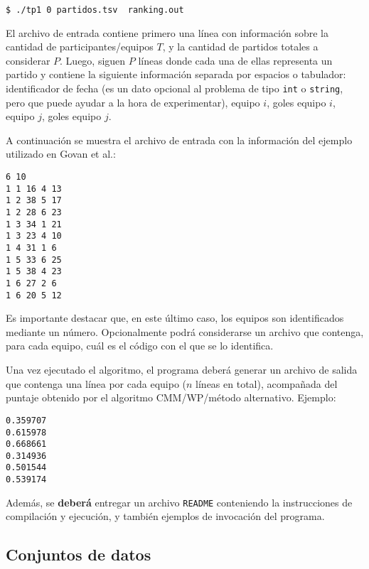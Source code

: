 \documentclass[11pt,a4paper]{article}
\begin{document}
\begin{verbatim}
$ ./tp1 0 partidos.tsv  ranking.out
\end{verbatim}

El archivo de entrada contiene primero una línea con información sobre la cantidad de participantes/equipos $T$, y la cantidad de partidos totales a considerar $P$. 
Luego, siguen $P$ líneas donde cada una de ellas representa un partido y contiene la siguiente información separada por espacios o tabulador: 
identificador de fecha (es un dato opcional al problema de tipo  \verb|int| o \verb+string+, pero que puede ayudar a la hora de experimentar), equipo $i$, goles equipo $i$, equipo $j$, goles equipo $j$.

A continuación se muestra el archivo de entrada con la información del ejemplo utilizado en Govan et al.\cite{Govan2008}:

\begin{verbatim}
6 10
1 1 16 4 13
1 2 38 5 17
1 2 28 6 23
1 3 34 1 21
1 3 23 4 10
1 4 31 1 6
1 5 33 6 25
1 5 38 4 23
1 6 27 2 6
1 6 20 5 12
\end{verbatim}

Es importante destacar que, en este último caso, los equipos son identificados mediante un número. Opcionalmente podrá considerarse un archivo que contenga,  para cada equipo, cuál es el código con el que se lo identifica.

Una vez ejecutado el algoritmo, el programa deberá generar un archivo de salida que contenga una línea por cada
equipo ($n$ líneas en total), acompañada del puntaje obtenido por el algoritmo CMM/WP/método alternativo. Ejemplo:

\begin{verbatim}
0.359707
0.615978
0.668661
0.314936
0.501544
0.539174
\end{verbatim}

Además, se \textbf{deberá} entregar un archivo \texttt{README} conteniendo la instrucciones de compilación y ejecución, y también ejemplos de invocación del programa.


\subsection*{Conjuntos de datos}
\end{document}
